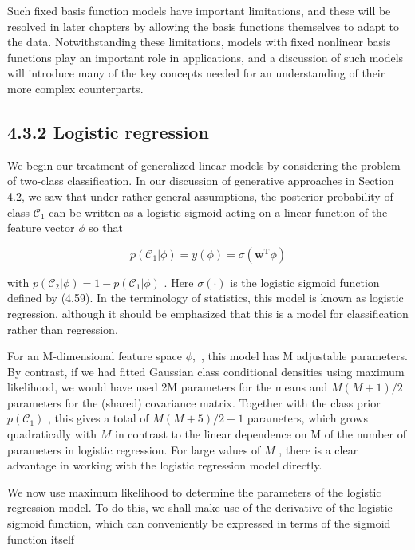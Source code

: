 \documentclass[
  10
]{article}
\begin{document}
Such fixed basis function models have important limitations, and these
will be resolved in later chapters by allowing the basis functions
themselves to adapt to the data. Notwithstanding these limitations,
models with fixed nonlinear basis functions play an important role in
applications, and a discussion of such models will introduce many of the
key concepts needed for an understanding of their more complex
counterparts.

\subsection{4.3.2 Logistic regression}\label{logistic-regression}

We begin our treatment of generalized linear models by considering the
problem of two-class classification. In our discussion of generative
approaches in Section 4.2, we saw that under rather general assumptions,
the posterior probability of class \(\mathcal { C } _ { 1 }\) can be
written as a logistic sigmoid acting on a linear function of the feature
vector \(\phi\) so that

\[
p (\mathcal {C} _ {1} | \phi) = y (\phi) = \sigma \left(\mathbf {w} ^ {\mathrm{T}} \phi\right)\tag{4.87}
\]

with
\(p ( \mathcal { C } _ { 2 } | \phi ) = 1 - p ( \mathcal { C } _ { 1 } | \phi )\)
. Here \(\sigma ( \cdot )\) is the logistic sigmoid function defined by
(4.59). In the terminology of statistics, this model is known as
logistic regression, although it should be emphasized that this is a
model for classification rather than regression.

For an M-dimensional feature space \(\phi ,\) , this model has M
adjustable parameters. By contrast, if we had fitted Gaussian class
conditional densities using maximum likelihood, we would have used 2M
parameters for the means and \(M ( M + 1 ) / 2\) parameters for the
(shared) covariance matrix. Together with the class prior
\(p ( \mathcal { C } _ { 1 } )\) , this gives a total of
\(M ( M + 5 ) / 2 + 1\) parameters, which grows quadratically with \(M\)
in contrast to the linear dependence on M of the number of parameters in
logistic regression. For large values of \(M\) , there is a clear
advantage in working with the logistic regression model directly.

We now use maximum likelihood to determine the parameters of the
logistic regression model. To do this, we shall make use of the
derivative of the logistic sigmoid function, which can conveniently be
expressed in terms of the sigmoid function itself
\end{document}

